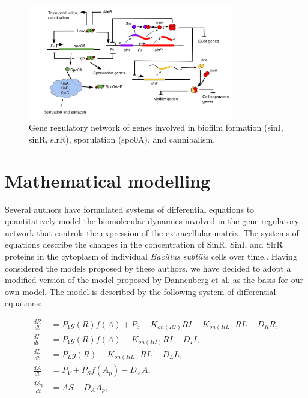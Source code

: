 \begin{figure}[h]
    \centering
    \includegraphics[width=0.8\textwidth]{figures/circuit.png}
    \caption{Gene regulatory network of genes involved in biofilm formation (sinI, sinR, slrR), sporulation (spo0A), and cannibalism.
    }
    \label{fig:circuit}
\end{figure}


\section{Mathematical modelling}\label{sec:litrev:theme2}
Several authors have formulated systems of differential equations to quantitatively model the biomolecular dynamics involved in the gene regulatory network that controls the expression of the extracellular matrix. The systems of equations describe the changes in the concentration of SinR, SinI, and SlrR proteins in the cytoplasm of individual \textit{Bacillus subtilis} cells over time.{\footnotesize\cite{simon}\cite{Voigt2005}\cite{Newman2013}\cite{Chen2023}\cite{Pedreira2021}\cite{Hallinan2010}}. Having considered the models proposed by these authors, we have decided to adopt a modified version of the model proposed by Dannenberg et al. {\footnotesize\cite{simon}} as the basis for our own model. The model is described by the following system of differential equations:

\begin{align}
\frac{dR}{dt} &= P_{1}g(R)f(A)+P_{3} - K_{on(RI)} R I - K_{on(RL)}RL  - D_{R} R, \label{eq:1} \\
\frac{dI}{dt} &= P_{1}g(R)f(A)  - K_{on(RI)} R I - D_{I} I, \label{eq:2} \\
\frac{dL}{dt} &= P_{L}g(R) - K_{on(RL)} RL - D_{L} L , \label{eq:3} \\
\frac{dA}{dt} &= P_V + P_S f(A_p) - D_A A, \label{eq:4}\\
\frac{dA_p}{dt} &= A S - D_A A_p, \label{eq:5}
\end{align}

